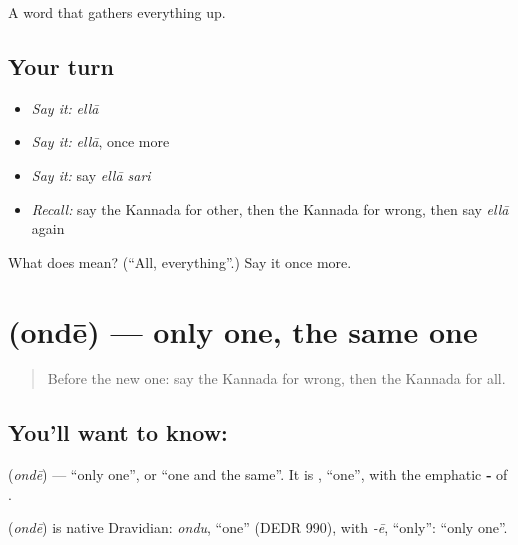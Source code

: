 \begin{grammarlens}[title={What you've built}]
A word that gathers everything up.
\end{grammarlens}

\subsection*{Your turn}
\begin{itemize}
\raggedright
  \item \emph{Say it:} \emph{ellā}
  \item \emph{Say it:} \emph{ellā}, once more
  \item \emph{Say it:} say \emph{ellā sari}
  \item \emph{Recall:} say the Kannada for other, then the Kannada for wrong, then say \emph{ellā} again
\end{itemize}

\begin{tcolorbox}[breakable,colback=teal!4,colframe=teal!35!black,title={Before you move on}]
What does  mean? (\textquotedblleft{}All, everything\textquotedblright{}.) Say it once more.
\end{tcolorbox}
\section[\texorpdfstring{\kn{ಒಂದೇ} (ondē)}{ಒಂದೇ (ondē)}]{ (ondē) — only one, the same one}

\label{lesson:KA-C102-onlyone}



\begin{quote}
Before the new one: say the Kannada for wrong, then the Kannada for all.
\end{quote}

\subsection*{You'll want to know: }
\textbf{} (\emph{ondē}) — \textquotedblleft{}only one\textquotedblright{}, or \textquotedblleft{}one and the same\textquotedblright{}. It is \textbf{}, \textquotedblleft{}one\textquotedblright{}, with the emphatic \textbf{‑} of \textbf{}.

\begin{cousinweb}
\textbf{} (\emph{ondē}) is native Dravidian: \emph{ondu}, \textquotedblleft{}one\textquotedblright{} (DEDR 990), with \emph{-ē}, \textquotedblleft{}only\textquotedblright{}: \textquotedblleft{}only one\textquotedblright{}.
\end{cousinweb}

